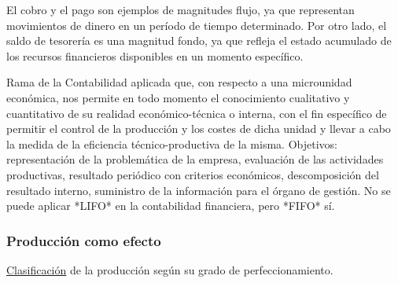 \documentclass[12pt]{book} %
\begin{document}
\begin{ejemplo}
El cobro y el pago son ejemplos de magnitudes flujo, ya que representan movimientos de dinero en un período de tiempo determinado. Por otro lado, el saldo de tesorería es una magnitud fondo, ya que refleja el estado acumulado de los recursos financieros disponibles en un momento específico.
\end{ejemplo}


\begin{definicion}
Rama de la Contabilidad aplicada que, con respecto a una microunidad económica, nos permite en todo momento el conocimiento cualitativo y cuantitativo de su realidad económico-técnica o interna, con el fin específico de permitir el control de la producción y los costes de dicha unidad y llevar a cabo la medida de la eficiencia técnico-productiva de la misma. Objetivos: representación de la problemática de la empresa, evaluación de las actividades productivas, resultado periódico con criterios económicos, descomposición del resultado interno, suministro de la información para el órgano de gestión. No se puede aplicar *LIFO* en la contabilidad financiera, pero *FIFO* sí.
\end{definicion}

\subsubsection*{Producción como efecto}

\underline{Clasificación} de la producción según su grado de
perfeccionamiento.
\end{document}
